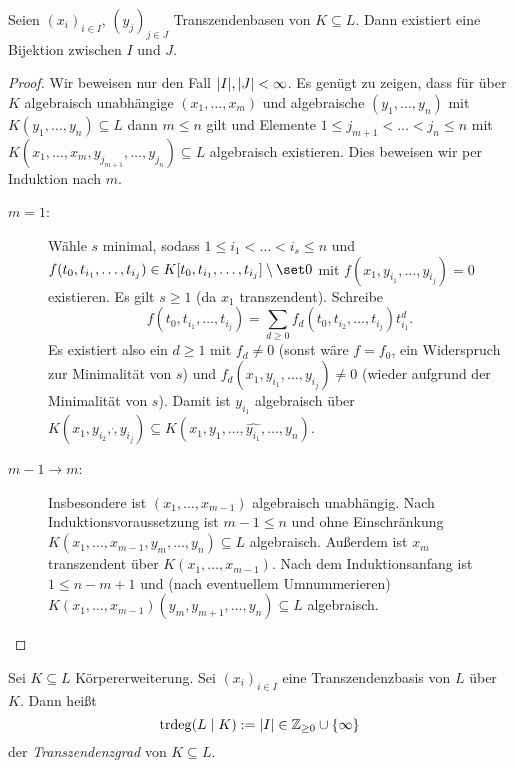 \documentclass[12pt,a4paper]{scrartcl}
\theoremstyle{cplain}
\theoremstyle{cdef}
\begin{document}
\begin{satz}
	Seien $(x_i)_{i\in I}$, $(y_j)_{j\in J}$ Transzendenbasen von $K\subseteq L$. Dann existiert eine Bijektion zwischen $I$ und $J$.
\end{satz}
\begin{proof}
	Wir beweisen nur den Fall $\lvert I\rvert, \lvert J\rvert <\infty$. Es genügt zu zeigen, dass für über $K$ algebraisch unabhängige $(x_1,\dots, x_m)$ und algebraische $(y_1,\dots, y_n)$ mit $K(y_1,\dots, y_n)\subseteq L$ dann $m\le n$ gilt und Elemente $1\le j_{m+1}<\dots < j_n\le n$ mit $K(x_1,\dots, x_m, y_{j_{m+1}},\dots, y_{j_n})\subseteq L$ algebraisch existieren. Dies beweisen wir per Induktion nach $m$.
	\begin{description}
		\item[$m = 1$:] Wähle $s$ minimal, sodass $1\le i_1<\dots <i_s\le n$ und $f(t_0,t_{i_1}, \dots, t_{i_j})\in K[t_0, t_{i_1},\dots, t_{i_j}]\setminus \set 0$ mit $f(x_1, y_{i_1}, \dots, y_{i_j}) = 0$ existieren. Es gilt $s\ge 1$ (da $x_1$ transzendent). Schreibe
		\[f(t_0, t_{i_1},\dots, t_{i_j}) = \sum_{d\ge 0} f_d(t_0, t_{i_2}, \dots, t_{i_j})t_{i_1}^d.\]
		Es existiert also ein $d\ge 1$ mit $f_d \neq 0$ (sonst wäre $f = f_0$, ein Widerspruch zur Minimalität von $s$) und $f_d(x_1, y_{i_1},\dots, y_{i_j}) \neq 0$ (wieder aufgrund der Minimalität von $s$). Damit ist $y_{i_1}$ algebraisch über $K(x_1, y_{i_2},\dot, y_{i_j})\subseteq K(x_1,y_1,\dots, \hat{y_{i_1}},\dots, y_n)$.
		\item[$m-1\to m$:] Insbesondere ist $(x_1,\dots, x_{m-1})$ algebraisch unabhängig. Nach Induktionsvoraussetzung ist $m-1\le n$ und ohne Einschränkung $K(x_1,\dots, x_{m-1}, y_m,\dots, y_n)\subseteq L$ algebraisch. Außerdem ist $x_m$ transzendent über $K(x_1,\dots, x_{m-1})$. Nach dem Induktionsanfang ist $1\le n-m+1$ und (nach eventuellem Umnummerieren) $K(x_1,\dots, x_{m-1})(y_m, y_{m+1}, \dots , y_n)\subseteq L$ algebraisch.
		\qedhere
	\end{description}
\end{proof}
\begin{defi}
	Sei $K\subseteq L$ Körpererweiterung. Sei $(x_i)_{i\in I}$ eine Transzendenzbasis von $L$ über $K$. Dann heißt 
	\[\operatorname{trdeg}(L\mid K) := \lvert I\rvert\in\mathbb Z_{\ge 0}\cup \{\infty\}\]
	der \emph{Transzendenzgrad} von $K\subseteq L$.
\end{defi}
\end{document}
